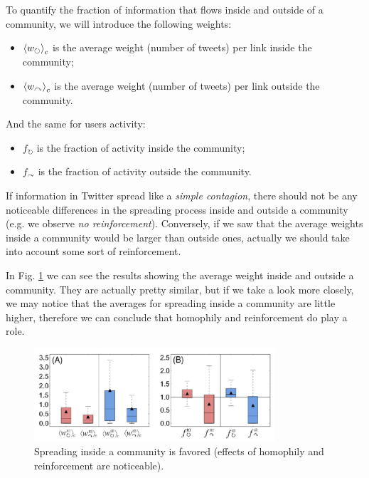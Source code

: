 \documentclass[../main/main.tex]{subfiles}
\begin{document}
To quantify the fraction of information that flows inside and outside of a community, we will introduce the following weights:
\begin{itemize}
\item \( \expval{w_\circlearrowright}_c  \) is the average weight (number of tweets) per link inside the community;

\item \( \expval{w_\curvearrowright}_c  \) is the average weight (number of tweets) per link outside the community.
\end{itemize}
And the same for users activity:
\begin{itemize}
\item \( f_\circlearrowright \) is the fraction of activity inside the community;

\item \( f_\curvearrowright  \) is the fraction of activity outside the community.
\end{itemize}

If information in Twitter spread like a \emph{simple contagion}, there should not be any noticeable differences in the spreading process inside and outside a community (e.g. we observe \emph{no reinforcement}). Conversely, if we saw that the average weights inside a community would be larger than outside ones, actually we should take into account some sort of reinforcement.

In Fig. \ref{fig:11_4} we can see the results showing the average weight inside and outside a community. They are actually pretty similar, but if we take a look more closely, we may notice that the averages for spreading inside a community are little higher, therefore we can conclude that homophily and reinforcement do play a role.

\begin{figure}[h!]
\centering
\includegraphics[width=0.8\textwidth]{../lessons/image/11/4.png}
\caption{\label{fig:11_4}  Spreading inside a community is favored (effects of homophily and reinforcement are noticeable).}
\end{figure}
\end{document}
